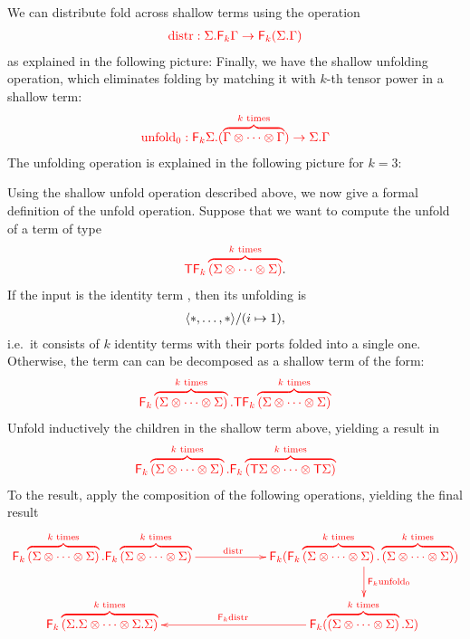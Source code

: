 We can distribute fold across shallow terms using the  operation
\begin{align*}
    {\color{red}{{\color{red}{\mathrm{distr}}}: {\color{red}{\Sigma . {\color{red}{\mathsf F_{k}}}\Gamma}} \to {\color{red}{\mathsf F_{k}}}({\color{red}{\Sigma . \Gamma}})}}
\end{align*}
as explained in the following picture:
Finally, we have the shallow unfolding operation, which eliminates folding   by matching it with $k$-th tensor power in a shallow term:
\begin{align*}
{\color{red}{
    {\color{red}{\mathrm{unfold}_0}}: {\color{red}{{\color{red}{\mathsf F_{k}}}\Sigma . (\overbrace{\Gamma \otimes \cdots \otimes \Gamma}^{\text{$k$ times}})}} \to {\color{red}{\Sigma . \Gamma}}
}}
\end{align*}
The unfolding operation is explained in the following picture for $k=3$:

\newcommand{\expmatrix}[1]{\reduce k \kpower{#1}}
\newcommand{\kpower}[1]{ \overbrace{(#1 \otimes \cdots \otimes #1)}^{\text{$k$ times}}}


Using the shallow unfold operation described above, we now give a formal definition of the unfold operation. Suppose that we want to compute the unfold of a term of type 
\begin{align*}
\ranked{\tmonad \expmatrix \Sigma}.
\end{align*}
If the input is the identity term ,  then its unfolding is 
\begin{align*}
    \langle{*,\ldots,*}\rangle/(i \mapsto 1),
\end{align*}
i.e.~it consists of $k$ identity terms with their ports folded into a single one.  Otherwise, the term can can be decomposed as a shallow term of the form: 
\begin{align*}
 \ranked{
    \shallowterm{ \expmatrix \Sigma} { \tmonad \expmatrix \Sigma}
}
\end{align*}
Unfold inductively  the children in the shallow term above, yielding a result in
\begin{align*}
   \ranked{
        \shallowterm{ \expmatrix \Sigma} {  \expmatrix {\tmonad \Sigma}}
    }
    \end{align*}
To the result, apply the composition of the following operations, yielding the final result
\begin{align*}
\ranked{
    \xymatrix@C=2cm{
        \shallowterm{\expmatrix \Sigma}{\expmatrix  \Sigma} \ar[r]^{\distrfold} &
        \reduce k (\shallowterm {\expmatrix \Sigma } {\kpower \Sigma}) \ar[d]^-{\reduce k \unfoldsmall}\\
        \reduce k \kpower{\shallowterm \Sigma \Sigma} &
        \reduce k (\shallowterm {\kpower \Sigma} \Sigma) \ar[l]_{\reduce k \distrtensor}
    }
}
\end{align*}

